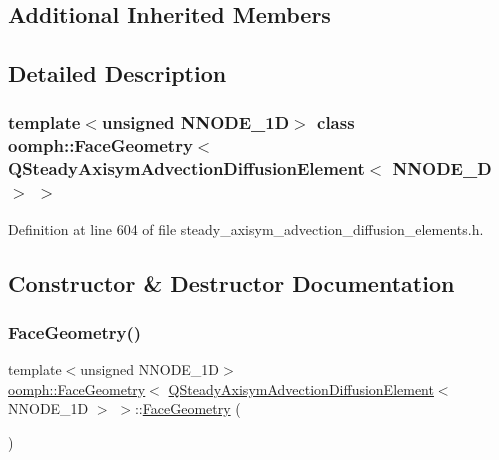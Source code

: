 \subsection*{Additional Inherited Members}


\subsection{Detailed Description}
\subsubsection*{template$<$unsigned N\+N\+O\+D\+E\+\_\+1D$>$\newline
class oomph\+::\+Face\+Geometry$<$ Q\+Steady\+Axisym\+Advection\+Diffusion\+Element$<$ N\+N\+O\+D\+E\+\_\+D $>$ $>$}



Definition at line 604 of file steady\+\_\+axisym\+\_\+advection\+\_\+diffusion\+\_\+elements.\+h.



\subsection{Constructor \& Destructor Documentation}
\mbox{\label{classoomph_1_1FaceGeometry_3_01QSteadyAxisymAdvectionDiffusionElement_3_01NNODE__1D_01_4_01_4_af895538fa66dc68cbbc725c3d5278df3}} 
\subsubsection{\texorpdfstring{Face\+Geometry()}{FaceGeometry()}}
{\footnotesize\ttfamily template$<$unsigned N\+N\+O\+D\+E\+\_\+1D$>$ \\
\hyperlink{classoomph_1_1FaceGeometry}{oomph\+::\+Face\+Geometry}$<$ \hyperlink{classoomph_1_1QSteadyAxisymAdvectionDiffusionElement}{Q\+Steady\+Axisym\+Advection\+Diffusion\+Element}$<$ N\+N\+O\+D\+E\+\_\+1D $>$ $>$\+::\hyperlink{classoomph_1_1FaceGeometry}{Face\+Geometry} (\begin{DoxyParamCaption}{ }\end{DoxyParamCaption})\hspace{0.3cm}{\ttfamily [inline]}}



